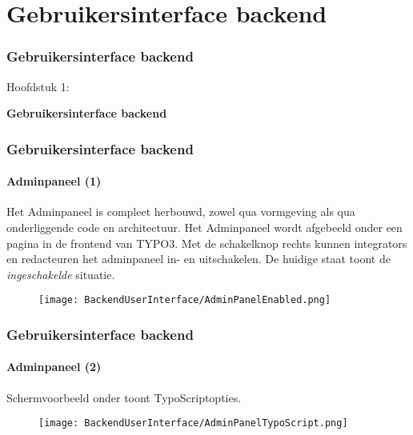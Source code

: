 %

\section{Gebruikersinterface backend}
\begin{frame}[fragile]
	\frametitle{Gebruikersinterface backend}

	\begin{center}\huge{Hoofdstuk 1:}\end{center}
	\begin{center}\huge{\color{typo3darkgrey}\textbf{Gebruikersinterface backend}}\end{center}

\end{frame}


\begin{frame}[fragile]
	\frametitle{Gebruikersinterface backend}
	\framesubtitle{Adminpaneel (1)}

	Het Adminpaneel is compleet herbouwd, zowel qua vormgeving als qua onderliggende
	code en architectuur.
	\newline\newline
	Het Adminpaneel wordt afgebeeld onder een pagina in de frontend van TYPO3.
	Met de schakelknop rechts kunnen integrators en redacteuren het adminpaneel in-
	en uitschakelen. De huidige staat toont de \textit{ingeschakelde} situatie.

	\begin{figure}
		\texttt{[image: BackendUserInterface/AdminPanelEnabled.png]}
	\end{figure}

\end{frame}


\begin{frame}[fragile]
	\frametitle{Gebruikersinterface backend}
	\framesubtitle{Adminpaneel (2)}

	Schermvoorbeeld onder toont TypoScriptopties.

	\begin{figure}
		\texttt{[image: BackendUserInterface/AdminPanelTypoScript.png]}
	\end{figure}

\end{frame}

